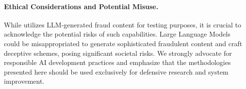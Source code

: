 \paragraph{Ethical Considerations and Potential Misuse.}
While \ourbench utilizes LLM-generated fraud content for testing purposes, it is crucial to acknowledge the potential risks of such capabilities. Large Language Models could be misappropriated to generate sophisticated fraudulent content and craft deceptive schemes, posing significant societal risks. We strongly advocate for responsible AI development practices and emphasize that the methodologies presented here should be used exclusively for defensive research and system improvement.


%




